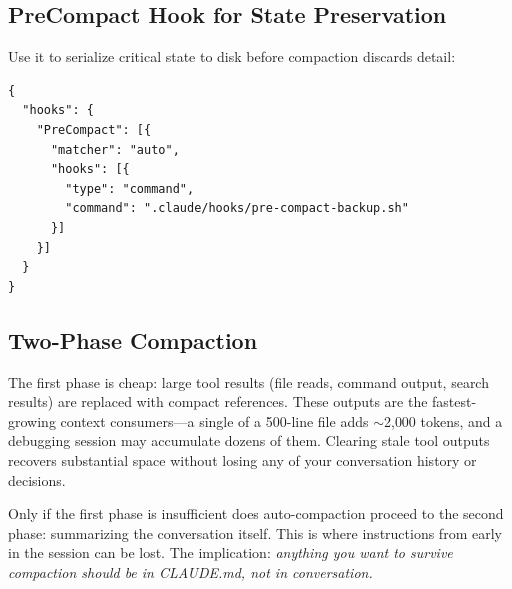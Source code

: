 \subsection{PreCompact Hook for State Preservation}


Use it to serialize critical state to disk before compaction discards detail:

\begin{verbatim}
{
  "hooks": {
    "PreCompact": [{
      "matcher": "auto",
      "hooks": [{
        "type": "command",
        "command": ".claude/hooks/pre-compact-backup.sh"
      }]
    }]
  }
}
\end{verbatim}


\subsection{Two-Phase Compaction}
\label{subsec:two-phase-compaction}


The first phase is cheap: large tool results (file reads, command output,
search results) are replaced with compact references.
These outputs are the fastest-growing context consumers---a single
 of a 500-line file adds $\sim$2{,}000 tokens, and a
debugging session may accumulate dozens of them.
Clearing stale tool outputs recovers substantial space without losing
any of your conversation history or decisions.


Only if the first phase is insufficient does auto-compaction
proceed to the second phase: summarizing the conversation itself.
This is where instructions from early in the session can be lost.
The implication: \emph{anything you want to survive compaction
should be in CLAUDE.md, not in conversation.}

